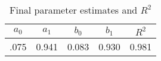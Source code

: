 
    \begin{table}\caption{Final parameter estimates and $R^2$}
\centering
    \begin{tabular}{ccccc}
    \toprule
    	 $a_0$ & $a_1$ & $b_0$ & $b_1$ & $R^2$ \\
    \hline.075 & 0.941 & 0.083 & 0.930 & 0.981\\

    \bottomrule
    \end{tabular}
    \end{table}